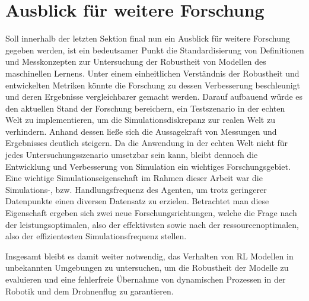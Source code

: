 \section{Ausblick für weitere Forschung}

Soll innerhalb der letzten Sektion final nun ein Ausblick für weitere Forschung gegeben werden, ist ein bedeutsamer Punkt die Standardisierung von Definitionen und Messkonzepten zur Untersuchung der Robustheit von Modellen des maschinellen Lernens.
Unter einem einheitlichen Verständnis der Robustheit und entwickelten Metriken könnte die Forschung zu dessen Verbesserung beschleunigt und deren Ergebnisse vergleichbarer gemacht werden.
Darauf aufbauend würde es den aktuellen Stand der Forschung bereichern, ein Testszenario in der echten Welt zu implementieren, um die Simulationsdiskrepanz zur realen Welt zu verhindern.
Anhand dessen ließe sich die Aussagekraft von Messungen und Ergebnisses deutlich steigern.
Da die Anwendung in der echten Welt nicht für jedes Untersuchungsszenario umsetzbar sein kann, bleibt dennoch die Entwicklung und Verbesserung von Simulation ein wichtiges Forschungsgebiet.
Eine wichtige Simulationseigenschaft im Rahmen dieser Arbeit war die Simulations-, bzw. Handlungsfrequenz des Agenten, um trotz geringerer Datenpunkte einen diversen Datensatz zu erzielen.
Betrachtet man diese Eigenschaft ergeben sich zwei neue Forschungsrichtungen, welche die Frage nach der leistungsoptimalen, also der effektivsten sowie nach der ressourcenoptimalen, also der effizientesten Simulationsfrequenz stellen.

Insgesamt bleibt es damit weiter notwendig, das Verhalten von RL Modellen in unbekannten Umgebungen zu untersuchen, um die Robustheit der Modelle zu evaluieren und eine fehlerfreie Übernahme von dynamischen Prozessen in der Robotik und dem Drohnenflug zu garantieren.